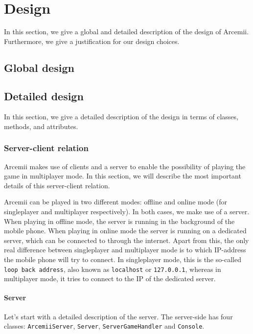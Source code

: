 \documentclass[../main.tex]{subfiles}
\begin{document}
\pagebreak

\section{Design}
In this section, we give a global and detailed description of the design of Arcemii. Furthermore, we give a justification for our design choices.

	\subsection{Global design}

	\pagebreak
	\subsection{Detailed design}
	In this section, we give a detailed description of the design in terms of classes, methods, and attributes.

		\subsubsection{Server-client relation}
		Arcemii makes use of clients and a server to enable the possibility of playing the game in multiplayer mode. In this section, we will describe the most important details of this server-client relation.

		Arcemii can be played in two different modes: offline and online mode (for singleplayer and multiplayer respectively). In both cases, we make use of a server. When playing in offline mode, the server is running in the background of the mobile phone. When playing in online mode the server is running on a dedicated server, which can be connected to through the internet. Apart from this, the only real difference between singleplayer and multiplayer mode is to which IP-address the mobile phone will try to connect. In singleplayer mode, this is the so-called \texttt{loop back address}, also known as \texttt{localhost} or \texttt{127.0.0.1}, whereas in multiplayer mode, it tries to connect to the IP of the dedicated server. 

		\paragraph{Server} 
		Let's start with a detailed description of the server. The server-side has four classes: \texttt{ArcemiiServer}, \texttt{Server}, \texttt{ServerGameHandler} and \texttt{Console}. 
		
\end{document}
